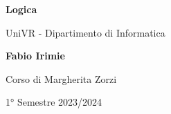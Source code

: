 \begin{titlepage}
	\begin{center}
		\vspace*{1cm}

		\Huge
		\textbf{Logica}

		\vspace{0.5cm}
		\LARGE
		UniVR - Dipartimento di Informatica

		\vspace{1.5cm}

		\textbf{Fabio Irimie}

		\vfill


		\vspace{0.8cm}

    Corso di Margherita Zorzi

		1° Semestre 2023/2024

	\end{center}
\end{titlepage}

